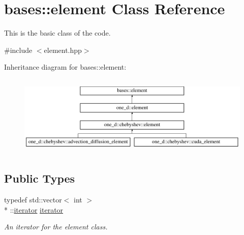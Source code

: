 \hypertarget{classbases_1_1element}{\section{bases\-:\-:element Class Reference}
\label{classbases_1_1element}
}


This is the basic class of the code.  




{\ttfamily \#include $<$element.\-hpp$>$}

Inheritance diagram for bases\-:\-:element\-:\begin{figure}[H]
\begin{center}
\leavevmode
\includegraphics[height=3.875432cm]{classbases_1_1element}
\end{center}
\end{figure}
\subsection*{Public Types}
\begin{DoxyCompactItemize}
\item 
typedef std\-::vector$<$ int $>$\\*
\-::\hyperlink{classbases_1_1element_ad6c297b8fbb3ea61a1a7048f0fbf7d89}{iterator} \hyperlink{classbases_1_1element_ad6c297b8fbb3ea61a1a7048f0fbf7d89}{iterator}
\begin{DoxyCompactList}\small\item\em An iterator for the element class. \end{DoxyCompactList}\end{DoxyCompactItemize}
